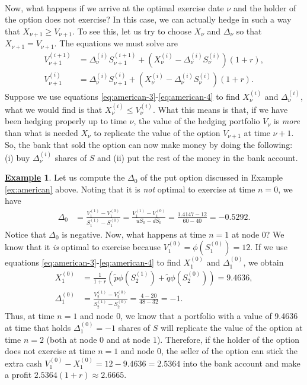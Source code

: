 \documentclass[12pt]{book}
\numberwithin{equation}{chapter}
\theoremstyle{plain}
\numberwithin{theorem}{section}
\theoremstyle{definition}
\newtheorem{example}[theorem]{\underline{Example}}
\numberwithin{exercise}{chapter}
\newcommand{\<}{\langle}
\renewcommand{\>}{\rangle}
\renewcommand{\(}{\left(}
\renewcommand{\)}{\right)}
\renewcommand{\[}{\left[}
\renewcommand{\]}{\right]}
\newcommand\Del{\Delta}
\newcommand\qt{\widetilde{q}}
\theoremstyle{definition}
\numberwithin{question}{section}
\newcommand\pt{\widetilde{p}}
\begin{document}
\\[0.5em]
Now, what happens if we arrive at the optimal exercise date $\nu$ and the holder of the option does not exercise?  In this case, we can actually hedge in such a way that $X_{\nu+1} \geq V_{\nu+1}$.  To see this, let us try to choose $X_\nu$ and $\Del_\nu$ so that $X_{\nu+1} = V_{\nu+1}$.  The equations we must solve are
\begin{align}
V_{\nu+1}^{(i+1)} 
	&=	\Del_\nu^{(i)} S_{\nu+1}^{(i+1)} + (X_\nu^{(i)} - \Del_\nu^{(i)} S_\nu^{(i)}) (1+r) , \label{eq:american-3} \\
V_{\nu+1}^{(i)}
	&=	\Del_\nu^{(i)} S_{\nu+1}^{(i)} + (X_\nu^{(i)} - \Del_\nu^{(i)} S_\nu^{(i)}) (1+r) . \label{eq:american-4}
\end{align}
Suppose we use equations \eqref{eq:american-3}-\eqref{eq:american-4} to find $X_\nu^{(i)}$ and $\Del_\nu^{(i)}$, what we would find is that $X_\nu^{(i)} \leq V_{\nu}^{(i)}$.  What this means is that, if we have been hedging properly up to time $\nu$, the value of the hedging portfolio $V_\nu$ is \textit{more} than what is needed $X_\nu$ to replicate the value of the option $V_{\nu+1}$ at time $\nu+1$.  So, the bank that sold the option can now make money by doing the following:
(i) buy $\Del_\nu^{(i)}$ shares of $S$ and (ii) put the rest of the money in the bank account.

\begin{example}
Let us compute the $\Del_0$ of the put option discussed in Example \ref{ex:american} above.  Noting that it is \textit{not} optimal to exercise at time $n=0$, we have
\begin{align}
\Delta_{0} 
	&= \frac{V_{1}^{(1)} - V_{1}^{(0)}}{S_{1}^{(1)} - S_{1}^{(0)}} 
	 = \frac{V_{1}^{(1)} - V_{1}^{(0)}}{u S_0 - d S_0} 
	=	\frac{ 1.4147 - 12}{60 - 40}
	=		-0.5292 .
\end{align}
Notice that $\Del_0$ is negative.  
Now, what happens at time $n=1$ at node $0$?  We know that it \textit{is} optimal to exercise because $V_1^{(0)} = \phi(S_1^{(0)}) = 12$.  If we use equations \eqref{eq:american-3}-\eqref{eq:american-4} to find $X_1^{(0)}$ and $\Del_1^{(0)}$, we obtain
\begin{align}
X_1^{(0)}
	&=	\frac{1}{1+r} \( \pt \phi(S_{2}^{(1)}) + \qt \phi(S_{2}^{(0)})\) =  9.4636  , \\
\Del_1^{(0)}
	&=	\frac{V_{2}^{(1)} - V_{2}^{(0)}}{S_{2}^{(1)} - S_{2}^{(0)}} = \frac{4 - 20}{48 - 32} = - 1 .
\end{align}
Thus, at time $n=1$ and node $0$, we know that a portfolio with a value of 9.4636 at time that holds $\Del_1^{(0)} = -1$ shares of $S$ will replicate the value of the option at time $n=2$ (both at node $0$ and at node $1$).  Therefore, if the holder of the option does not exercise at time $n=1$ and node $0$, the seller of the option can stick the extra cash $V_1^{(0)} - X_1^{(0)} = 12 - 9.4636 = 2.5364$ into the bank account and make a profit $2.5364 (1+r) \approx 2.6665$.
\end{example}
\end{document}
